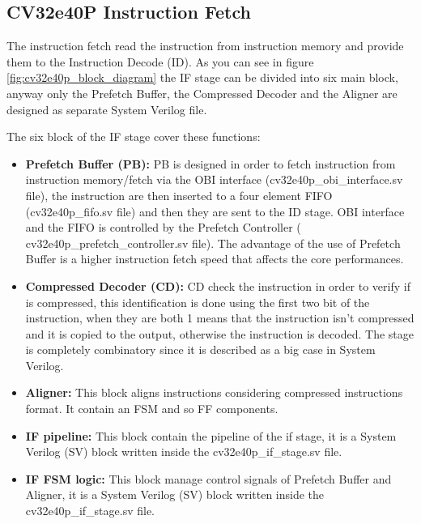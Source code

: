 {{		\subsection{CV32e40P Instruction Fetch}{
		    The instruction fetch read the instruction from instruction memory and provide them to the Instruction Decode (ID).
		    As you can see in figure \ref{fig:cv32e40p_block_diagram} the IF stage can be divided into six main block, anyway only  the Prefetch Buffer, the Compressed Decoder and the Aligner are designed as separate System Verilog file.
		    
        	The six block of the IF stage cover these functions:
        	\begin{itemize}
        	    \item \textbf{Prefetch Buffer (PB):} PB is designed in order to fetch instruction from instruction memory/fetch via the OBI interface (cv32e40p\_obi\_interface.sv file), the instruction are then inserted to a four element FIFO (cv32e40p\_fifo.sv file) and then they are sent to the ID stage. OBI interface and the FIFO is controlled by the Prefetch Controller ( cv32e40p\_prefetch\_controller.sv file). 
        	    The advantage of the use of Prefetch Buffer is a higher instruction fetch speed that affects the core performances.
        	   
        	    \item \textbf{Compressed Decoder (CD):} CD check the instruction in order to verify if is compressed, this identification is done using the first two bit of the instruction, when they are both 1 means that the instruction isn't compressed and it is copied to the output, otherwise the instruction is decoded. 
        	    The stage is completely combinatory since it is described as a big case in System Verilog.
        	    
        	    \item \textbf{Aligner:} This block aligns instructions considering compressed instructions format. It contain an FSM and so FF components.
        	    
        	    \item \textbf{IF pipeline:} This block contain the pipeline of the if stage, it is a System Verilog (SV) block written inside the cv32e40p\_if\_stage.sv file.
        	    
        	    \item \textbf{IF FSM logic:} This block manage control signals of Prefetch Buffer and Aligner, it is a System Verilog (SV) block written inside the cv32e40p\_if\_stage.sv file.
        	    

\end{itemize}}}}
